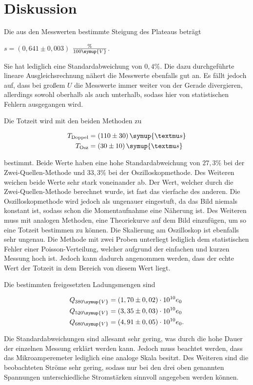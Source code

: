 \section{Diskussion}
\label{sec:Diskussion}

Die aus den Messwerten bestimmte Steigung des Plateaus beträgt

\begin{center}
    $s = (0,641 \pm 0,003)$ $\frac{\%}{100\symup{V}}$.
\end{center}

Sie hat lediglich eine Standardabweichung von $0,4 \%$. Die dazu durchgeführte lineare Ausgleichsrechnung
nähert die Messwerte ebenfalls gut an. Es fällt jedoch auf, dass bei großem $U$ die Messwerte immer weiter von der Gerade divergieren,
allerdings sowohl oberhalb als auch unterhalb, sodass hier von statistischen Fehlern ausgegangen wird.

Die Totzeit wird mit den beiden Methoden zu 

\begin{align*}
    T_\text{Doppel} &= (110 \pm 30) \, \symup{µs}\\
    T_\text{Osz} &= (30 \pm 10) \, \symup{µs}
\end{align*}

bestimmt. Beide Werte haben eine hohe Standardabweichung von $27,3 \%$ bei der Zwei-Quellen-Methode und $33,3 \%$ bei der Oszilloskopmethode.
Des Weiteren weichen beide Werte sehr stark voneinander ab. Der Wert, welcher durch die Zwei-Quellen-Methode berechnet wurde, ist fast das vierfache des anderen.
Die Oszilloskopmethode wird jedoch als ungenauer eingestuft, da das Bild niemals konstant ist, sodass schon die Momentaufnahme eine Näherung ist.
Des Weiteren muss mit analogen Methoden, eine Theoriekurve auf dem Bild einzufügen, um so eine Totzeit bestimmen zu können.
Die Skalierung am Oszilloskop ist ebenfalls sehr ungenau.
Die Methode mit zwei Proben unterliegt lediglich dem statistischen Fehler einer Poisson-Verteilung, welcher aufgrund der einfachen und kurzen Messung hoch ist.
Jedoch kann dadurch angenommen werden, dass der echte Wert der Totzeit in dem Bereich von diesem Wert liegt.

Die bestimmten freigesetzten Ladungsmengen sind

\begin{align*}
    Q_{380 \symup{V}} &= (1,70 \pm 0,02) \cdot 10^{10} e_0\\
    Q_{520 \symup{V}} &= (3,35 \pm 0,03) \cdot 10^{10} e_0\\
    Q_{680 \symup{V}} &= (4,91 \pm 0,05) \cdot 10^{10} e_0.
\end{align*}

Die Standardabweichungen sind allesamt sehr gering, was durch die hohe Dauer der einzelnen Messung erklärt werden kann.
Jedoch muss beachtet werden, dass das Mikroamperemeter lediglich eine analoge Skala besitzt.
Des Weiteren sind die beobachteten Ströme sehr gering, sodass nur bei den drei oben genannten Spannungen unterschiedliche Stromstärken sinnvoll angegeben werden können.

